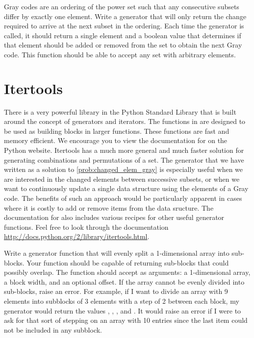 \begin{problem}
\label{prob:changed_elem_gray}
Gray codes are an ordering of the power set such that any consecutive subsets differ by exactly one element.  Write a generator that will only return the change required to arrive at the next subset in the ordering.  Each time the generator is called, 
it should return a single element and a boolean value that determines if that element should be
added or removed from the set to obtain the next Gray code.  This function should be able to accept any set with arbitrary elements.
\end{problem}

\section*{Itertools}
There is a very powerful library in the Python Standard Library that is built around the concept
of generators and iterators.  The functions in  are designed to be used as
building blocks in larger functions.  These functions are fast and memory efficient.
We encourage you to view the documentation for  on the Python website.  Itertools has a much more general and much faster solution for generating combinations and permutations of a set.
The generator that we have written as a solution to \ref{prob:changed_elem_gray} is especially useful when we are interested in the changed elements between successive subsets, or when we want to continuously update a single data structure using the elements of a Gray code.
The benefits of such an approach would be particularly apparent in cases where it is costly to add or remove items from the data sructure.
The documentation for  also includes various recipes for other useful generator functions.
Feel free to look through the documentation \url{http://docs.python.org/2/library/itertools.html}.

\begin{problem}
\label{prob:subblocks}
Write a generator function that will evenly split a 1-dimensional array into sub-blocks.
Your function should be capable of returning sub-blocks that could possibly overlap.
The function should accept as arguments: a 1-dimensional array, a block width, and an optional offset.
If the array cannot be evenly divided into sub-blocks, raise an error.
For example, if I want to divide an array with 9 elements into subblocks of 3 elements with a step of 2 between each block, my generator would return the values , , , and .
It would raise an error if I were to ask for that sort of stepping on an array with 10 entries since the last item could not be included in any subblock.
\end{problem}

